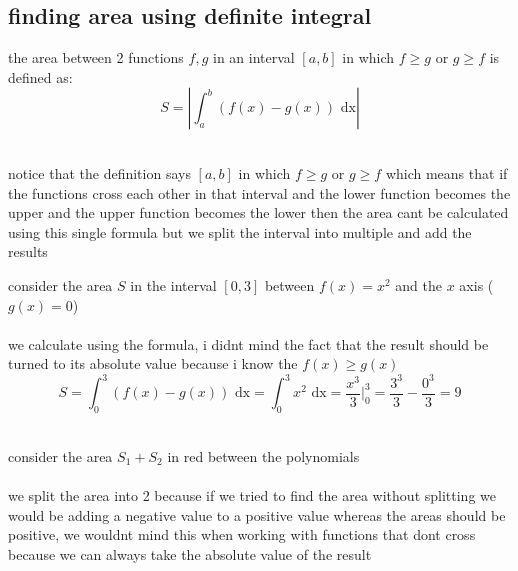 \documentclass[a4paper,12pt]{article}
\newcommand{\?}{\stackrel{?}{=}}
\begin{document}
\subsection{finding area using definite integral}
\label{sec:org433c754}
\begin{definition}
the area between 2 functions \(f,g\) in an interval \([a,b]\) in which \(f \geq g\) or \(g \geq f\) is defined as:\\[0pt]
\[
  S = \left| \int_a^b (f(x) - g(x)) \text{ dx} \right|
\]\\[0pt]

\begin{note}
notice that the definition says \([a,b]\) in which \(f \geq g\) or \(g \geq f\) which means that if the functions cross each other in that interval and the lower function becomes the upper and the upper function becomes the lower then the area cant be calculated using this single formula but we split the interval into multiple and add the results\\[0pt]
\end{note}

\begin{my_example}
consider the area \(S\) in the interval \([0,3]\) between \(f(x)=x^2\) and the \(x\) axis (\(g(x)=0\))\\[0pt]

\\[0pt]

we calculate using the formula, i didnt mind the fact that the result should be turned to its absolute value because i know the \(f(x) \geq g(x)\)\\[0pt]

\[
  S = \int_0^3 (f(x) - g(x)) \text{ dx} = \int_0^3 x^2 \text{ dx} = \frac{x^3}{3} \Big|_0^3 = \frac{3^3}{3} - \frac{0^3}{3} = 9
\]\\[0pt]
\end{my_example}

\begin{my_example}
consider the area \(S_1 + S_2\) in red between the polynomials\\[0pt]

\\[0pt]

we split the area into 2 because if we tried to find the area without splitting we would be adding a negative value to a positive value whereas the areas should be positive, we wouldnt mind this when working with functions that dont cross because we can always take the absolute value of the result\\[0pt]


\end{my_example}
\end{definition}
\end{document}
